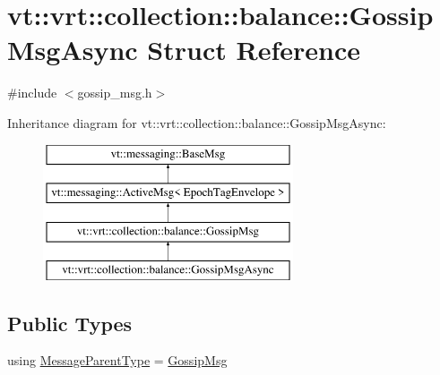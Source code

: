 \hypertarget{structvt_1_1vrt_1_1collection_1_1balance_1_1_gossip_msg_async}{}\section{vt\+:\+:vrt\+:\+:collection\+:\+:balance\+:\+:Gossip\+Msg\+Async Struct Reference}
\label{structvt_1_1vrt_1_1collection_1_1balance_1_1_gossip_msg_async}


{\ttfamily \#include $<$gossip\+\_\+msg.\+h$>$}

Inheritance diagram for vt\+:\+:vrt\+:\+:collection\+:\+:balance\+:\+:Gossip\+Msg\+Async\+:\begin{figure}[H]
\begin{center}
\leavevmode
\includegraphics[height=4.000000cm]{structvt_1_1vrt_1_1collection_1_1balance_1_1_gossip_msg_async}
\end{center}
\end{figure}
\subsection*{Public Types}
\begin{DoxyCompactItemize}
\item 
using \hyperlink{structvt_1_1vrt_1_1collection_1_1balance_1_1_gossip_msg_async_a5693222c4f2f5cf7641120d9e815bde7}{Message\+Parent\+Type} = \hyperlink{structvt_1_1vrt_1_1collection_1_1balance_1_1_gossip_msg}{Gossip\+Msg}
\end{DoxyCompactItemize}
